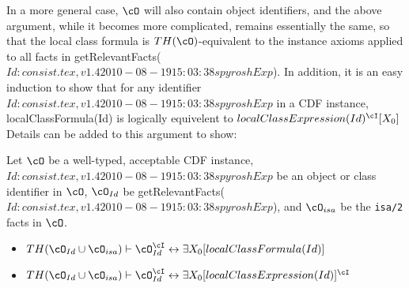 In a more general case, $\cO$ will also contain object identifiers,
and the above argument, while it becomes more complicated, remains
essentially the same, so that the local class formula is
$TH(\cO)$-equivalent to the instance axioms applied to all facts in
{\sf getRelevantFacts($Id: consist.tex,v 1.4 2010-08-19 15:03:38 spyrosh Exp $)}.  In addition, it is an easy induction to
show that for any identifier $Id: consist.tex,v 1.4 2010-08-19 15:03:38 spyrosh Exp $ in a CDF instance, {\sc
localClassFormula(Id)} is logically equivelent to
$localClassExpression(Id)^{\cI}[X_0]$
%
%
Details can be added to this argument to show: 

\begin{lemma} \label{lem:localce}
Let $\cO$ be a well-typed, acceptable CDF instance, $Id: consist.tex,v 1.4 2010-08-19 15:03:38 spyrosh Exp $ be an object
or class identifier in $\cO$, $\cO_{Id}$ be {\sf
getRelevantFacts($Id: consist.tex,v 1.4 2010-08-19 15:03:38 spyrosh Exp $)}, and $\cO_{isa}$ be the {\tt isa/2} facts
in $\cO$.
\begin{itemize}
\item $TH(\cO_{Id} \cup \cO_{isa}) \vdash \cO_{Id}^{\cI}
\leftrightarrow \exists X_0 [localClassFormula(Id)] $
\item 
$TH(\cO_{Id} \cup \cO_{isa}) \vdash \cO_{Id}^{\cI}
\leftrightarrow \exists X_0[localClassExpression(Id)]^{\cI}$
\end{itemize}
\end{lemma}


